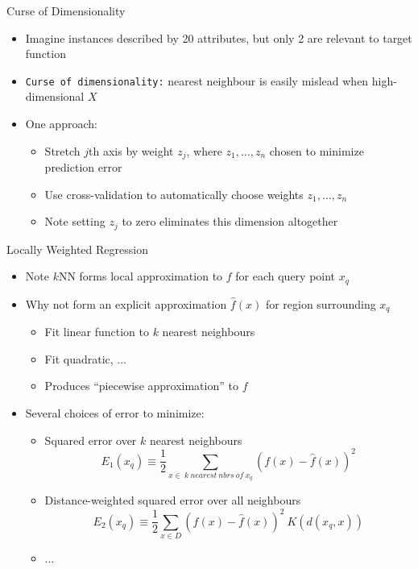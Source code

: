\documentclass[%
pdf,
colorBG,
slideColor,
tcrico,
]{prosper}
\begin{document}
\begin{slide}{Curse of Dimensionality }

\begin{itemize}
 \item  Imagine instances described by 20 attributes, but only 2 are relevant to target function
\item  \texttt{Curse of dimensionality:} nearest neighbour is easily mislead when high-dimensional $X$
\item One approach:
	\begin{itemize}
	\item Stretch $j$th axis by weight $z_j$, where $z_1, \ldots, z_n$
	chosen to minimize prediction error
	\item Use cross-validation to automatically choose weights $z_1, \ldots, z_n$
	\item Note setting $z_j$ to zero eliminates this dimension altogether
	\end{itemize}
	\end{itemize}
\end{slide}


\begin{slide}{Locally Weighted Regression }
\tiny
\begin{itemize}
 \item  Note $k$NN forms local approximation to $f$ for each query point $x_q$
\item Why not form an explicit approximation $\hat{f}(x)$ for region surrounding $x_q$
	\begin{itemize}
	\item Fit linear function to $k$ nearest neighbours
	\item Fit quadratic, ...
	\item Produces ``piecewise approximation'' to $f$
	\end{itemize}
\item  Several choices of error to minimize:
	\begin{itemize}
	\item Squared error over $k$ nearest neighbours
	\[E_{1}(x_q) \equiv \frac{1}{2} \sum_{x \in\ k\ nearest\ nbrs\ of\ x_q} (f(x)
	- \hat{f}(x))^2 \]
	
	\item Distance-weighted squared error over all neighbours
	\[E_{2}(x_q) \equiv \frac{1}{2} \sum_{x \in D} (f(x) - \hat{f}(x))^2\
	K(d(x_{q}, x)) \]
	\item $\ldots$
	\end{itemize}
\end{itemize}
\end{slide}
\end{document}
